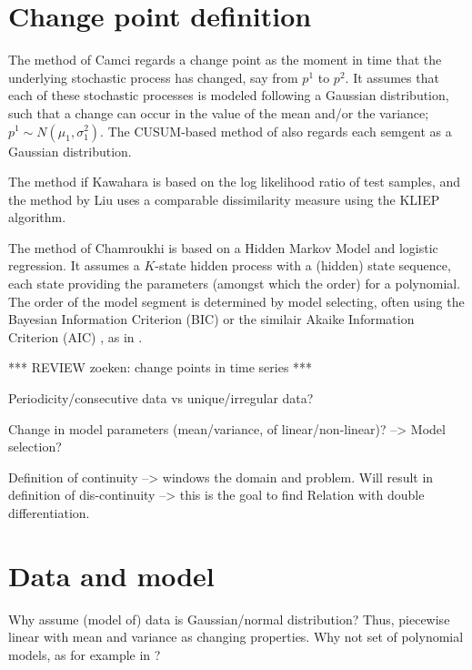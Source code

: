 \section{Change point definition}
The method of Camci \cite{camci2010change} regards a change point as the moment in time that the underlying stochastic process has changed, say from $p^1$ to $p^2$.
It assumes that each of these stochastic processes is modeled following a Gaussian distribution, such that a change can occur in the value of the mean and/or the variance; $p^1 \sim N(\mu_1, \sigma_1^2)$.
The CUSUM-based method of \cite{inclan1994use} also regards each semgent as a Gaussian distribution.

The method if Kawahara \etal \cite{kawahara2009change} is based on the log likelihood ratio of test samples, and the method by Liu \etal \cite{liu2013change} uses a comparable dissimilarity measure using the KLIEP algorithm.

The method of Chamroukhi \etal \cite{chamroukhi2013joint} is based on a Hidden Markov Model and logistic regression.
It assumes a $K$-state hidden process with a (hidden) state sequence, each state providing the parameters (amongst which the order) for a polynomial.
The order of the model segment is determined by model selecting, often using the Bayesian Information Criterion (BIC) or the similair Akaike Information Criterion (AIC) \cite{akaike1974new}, as in \cite{he2008activity}.

*** REVIEW zoeken: change points in time series ***

Periodicity/consecutive data vs unique/irregular data?

Change in model parameters (mean/variance, of linear/non-linear)? --> Model selection?

Definition of continuity --> windows the domain and problem.
Will result in definition of dis-continuity --> this is the goal to find
Relation with double differentiation.



\section{Data and model}
Why assume (model of) data is Gaussian/normal distribution? Thus, piecewise linear with mean and variance as changing properties. Why not set of polynomial models, as for example in \cite{chamroukhi2013joint}?

